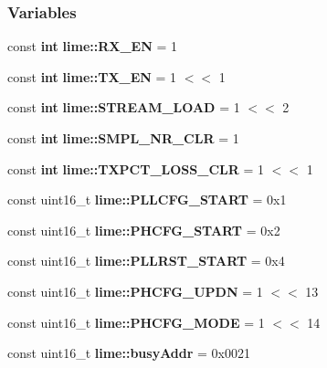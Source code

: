 \subsubsection*{Variables}
\begin{DoxyCompactItemize}
\item 
const {\bf int} {\bf lime\+::\+R\+X\+\_\+\+EN} = 1
\item 
const {\bf int} {\bf lime\+::\+T\+X\+\_\+\+EN} = 1 $<$$<$ 1
\item 
const {\bf int} {\bf lime\+::\+S\+T\+R\+E\+A\+M\+\_\+\+L\+O\+AD} = 1 $<$$<$ 2
\item 
const {\bf int} {\bf lime\+::\+S\+M\+P\+L\+\_\+\+N\+R\+\_\+\+C\+LR} = 1
\item 
const {\bf int} {\bf lime\+::\+T\+X\+P\+C\+T\+\_\+\+L\+O\+S\+S\+\_\+\+C\+LR} = 1 $<$$<$ 1
\item 
const uint16\+\_\+t {\bf lime\+::\+P\+L\+L\+C\+F\+G\+\_\+\+S\+T\+A\+RT} = 0x1
\item 
const uint16\+\_\+t {\bf lime\+::\+P\+H\+C\+F\+G\+\_\+\+S\+T\+A\+RT} = 0x2
\item 
const uint16\+\_\+t {\bf lime\+::\+P\+L\+L\+R\+S\+T\+\_\+\+S\+T\+A\+RT} = 0x4
\item 
const uint16\+\_\+t {\bf lime\+::\+P\+H\+C\+F\+G\+\_\+\+U\+P\+DN} = 1 $<$$<$ 13
\item 
const uint16\+\_\+t {\bf lime\+::\+P\+H\+C\+F\+G\+\_\+\+M\+O\+DE} = 1 $<$$<$ 14
\item 
const uint16\+\_\+t {\bf lime\+::busy\+Addr} = 0x0021
\end{DoxyCompactItemize}
